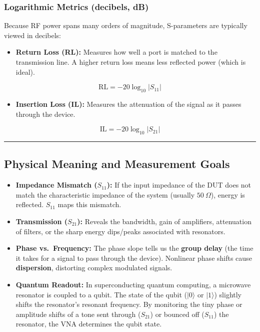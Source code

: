 \documentclass[
]{article}
\providecommand{\tightlist}{%
  \setlength{\itemsep}{0pt}\setlength{\parskip}{0pt}}
\begin{document}
\subsubsection{Logarithmic Metrics (decibels,
dB)}\label{logarithmic-metrics-decibels-db}

Because RF power spans many orders of magnitude, S-parameters are
typically viewed in decibels:

\begin{itemize}
\tightlist
\item
  \textbf{Return Loss (RL):} Measures how well a port is matched to the
  transmission line. A higher return loss means less reflected power
  (which is ideal).
\end{itemize}

\[\text{RL} = -20 \log_{10} |S_{11}|\]

\begin{itemize}
\tightlist
\item
  \textbf{Insertion Loss (IL):} Measures the attenuation of the signal
  as it passes through the device.
\end{itemize}

\[\text{IL} = -20 \log_{10} |S_{21}|\]

\begin{center}\rule{0.5\linewidth}{0.5pt}\end{center}

\subsection{Physical Meaning and Measurement
Goals}\label{physical-meaning-and-measurement-goals}

\begin{itemize}
\tightlist
\item
  \textbf{Impedance Mismatch (\(S_{11}\)):} If the input impedance of
  the DUT does not match the characteristic impedance of the system
  (usually \(50\ \Omega\)), energy is reflected. \(S_{11}\) maps this
  mismatch.
\item
  \textbf{Transmission (\(S_{21}\)):} Reveals the bandwidth, gain of
  amplifiers, attenuation of filters, or the sharp energy dips/peaks
  associated with resonators.
\item
  \textbf{Phase vs.~Frequency:} The phase slope tells us the
  \textbf{group delay} (the time it takes for a signal to pass through
  the device). Nonlinear phase shifts cause \textbf{dispersion},
  distorting complex modulated signals.
\item
  \textbf{Quantum Readout:} In superconducting quantum computing, a
  microwave resonator is coupled to a qubit. The state of the qubit
  (\(|0\rangle\) or \(|1\rangle\)) slightly shifts the resonator's
  resonant frequency. By monitoring the tiny phase or amplitude shifts
  of a tone sent through (\(S_{21}\)) or bounced off (\(S_{11}\)) the
  resonator, the VNA determines the qubit state.
\end{itemize}
\end{document}
